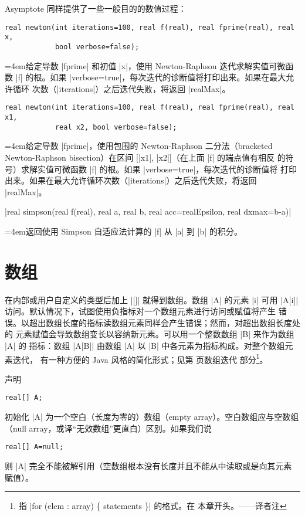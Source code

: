 \documentclass[nofonts,CJKnormalspaces]{ctexbook}[2009/05/20]
\newenvironment{funclist}{\trivlist
  \parindent=0pt
\item[]
  \def\item{\medskip\par\leftskip=0pt}
  \def\go{\par\leftskip=4em}}
{\endtrivlist}
\newcommand*\prgname[1]{\textsf{#1}}
\newcommand\transnote[1]{\footnote{#1——译者注}}
\begin{document}
{{{\prgname{Asymptote} 同样提供了一些一般目的的数值过程：
\begin{funclist}
\item 
\begin{lstlisting}[style=funclist]
real newton(int iterations=100, real f(real), real fprime(real), real x,
            bool verbose=false);
\end{lstlisting}
\go 给定导数 |fprime| 和初值 |x|，使用 Newton-Raphson 迭代求解实值可微函数
|f| 的根。如果 |verbose=true|，每次迭代的诊断值将打印出来。如果在最大允许循环
次数（|iterations|）之后迭代失败，将返回 |realMax|。

\item
\begin{lstlisting}[style=funclist]
real newton(int iterations=100, real f(real), real fprime(real), real x1,
            real x2, bool verbose=false);
\end{lstlisting}
\go 给定导数 |fprime|，使用包围的 Newton-Raphson 二分法（bracketed
Newton-Raphson bisection）在区间 $[$|x1|, |x2|$]$（在上面 |f| 的端点值有相反
的符号）求解实值可微函数 |f| 的根。如果 |verbose=true|，每次迭代的诊断值将
打印出来。如果在最大允许循环次数（|iterations|）之后迭代失败，将返回
|realMax|。

\item
|real simpson(real f(real), real a, real b, real acc=realEpsilon, real dxmax=b-a)|
\go 返回使用 Simpson 自适应法计算的 |f| 从 |a| 到 |b| 的积分。
\end{funclist}



\section{数组}
\label{sec:arrays}

在内部或用户自定义的类型后加上 |[]| 就得到数组。数组 |A| 的元素 |i| 可用
|A[i]| 访问。默认情况下，试图使用负指标对一个数组元素进行访问或赋值将产生
错误。以超出数组长度的指标读数组元素同样会产生错误；然而，对超出数组长度处的
元素赋值会导致数组变长以容纳新元素。可以用一个整数数组 |B| 来作为数组 |A| 的
指标：数组 |A[B]| 由数组 |A| 以 |B| 中各元素为指标构成。对整个数组元素迭代，
有一种方便的 Java 风格的简化形式；见第 \pageref{chap:programming} 页数组迭代
部分\transnote{指 \inlinecode|for (elem : array) \{ statements \}| 的格式。在
本章开头。}。

声明
\begin{lstlisting}
real[] A;
\end{lstlisting}
初始化 |A| 为一个空白（长度为零的）数组（empty array）。空白数组应与空数组
（null array，或译“无效数组”更直白）区别。如果我们说
\begin{lstlisting}
real[] A=null;
\end{lstlisting}
则 |A| 完全不能被解引用（空数组根本没有长度并且不能从中读取或是向其元素
赋值）。

}}}
\end{document}
